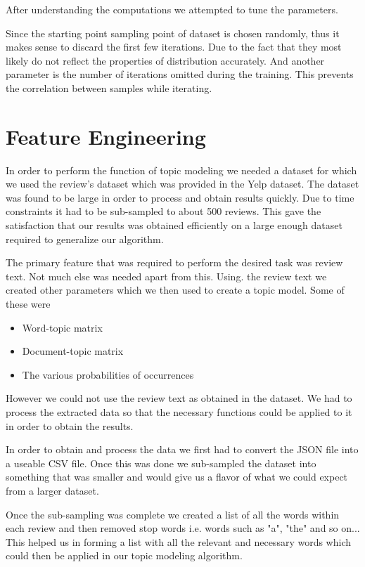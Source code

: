 \documentclass{article}
\begin{document}
After understanding the computations we attempted to tune the parameters.

Since the starting point sampling point of dataset is chosen randomly, thus it makes sense to discard the first few iterations. Due to the fact that they most likely do not reflect the properties of distribution accurately. And another parameter is  the number of iterations omitted during the training. This prevents the correlation between samples while iterating.


\section{Feature Engineering} 
	\label{engineer} 

	In order to perform the function of topic modeling we needed a dataset for which we used the review's dataset which was provided in the Yelp dataset. The dataset was found to be large in order to process and obtain results quickly. Due to time constraints it had to be sub-sampled to about 500 reviews. This gave the satisfaction that our results was obtained efficiently on a large enough dataset required to generalize our algorithm.
	
	The primary feature that was required to perform the desired task was review text. Not much else was needed apart from this. Using. the review text we created other parameters which we then used to create a topic model. Some of these were 
	
	\begin{itemize}
		\item{Word-topic matrix}
		\item{Document-topic matrix}
		\item{The various probabilities of occurrences}
	\end{itemize} 

	However we could not use the review text as obtained in the dataset. We had to process the extracted data so that the necessary functions could be applied to it in order to obtain the results. 
	
	In order to obtain and process the data we first had to convert the JSON file into a useable CSV file. Once this was done we sub-sampled the dataset into something that was smaller and would give us a flavor of what we could expect from a larger dataset. 
	
	Once the sub-sampling was complete we created a list of all the words within each review and then removed stop words i.e. words such as "a", "the" and so on... This helped us in forming a list with all the relevant and necessary words which could then be applied in our topic modeling algorithm. 
	
\end{document}
